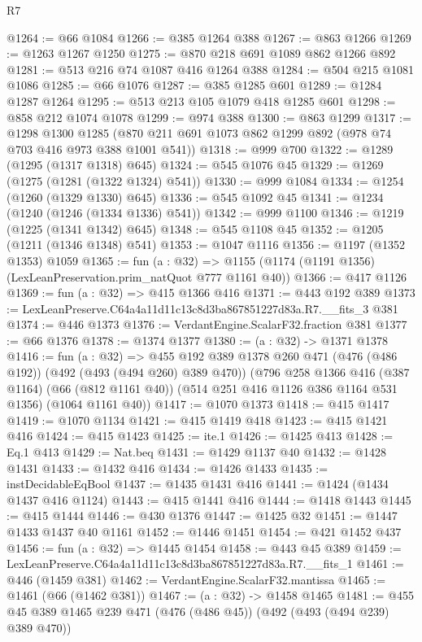 \begin{lexlean}{R7}
\begin{coremodule}
@1264 := @66 @1084
@1266 := @385 @1264 @388
@1267 := @863 @1266
@1269 := @1263 @1267 @1250
@1275 := @870 @218 @691 @1089 @862 @1266 @892
@1281 := @513 @216 @74 @1087 @416 @1264 @388
@1284 := @504 @215 @1081 @1086
@1285 := @66 @1076
@1287 := @385 @1285 @601
@1289 := @1284 @1287 @1264
@1295 := @513 @213 @105 @1079 @418 @1285 @601
@1298 := @858 @212 @1074 @1078
@1299 := @974 @388
@1300 := @863 @1299
@1317 := @1298
    @1300
    @1285
    (@870 @211 @691 @1073 @862 @1299 @892 (@978 @74 @703 @416 @973 @388 @1001 @541))
@1318 := @999 @700
@1322 := @1289 (@1295 (@1317 @1318) @645)
@1324 := @545 @1076 @45
@1329 := @1269 (@1275 (@1281 (@1322 @1324) @541))
@1330 := @999 @1084
@1334 := @1254 (@1260 (@1329 @1330) @645)
@1336 := @545 @1092 @45
@1341 := @1234 (@1240 (@1246 (@1334 @1336) @541))
@1342 := @999 @1100
@1346 := @1219 (@1225 (@1341 @1342) @645)
@1348 := @545 @1108 @45
@1352 := @1205 (@1211 (@1346 @1348) @541)
@1353 := @1047 @1116
@1356 := @1197 (@1352 @1353) @1059
@1365 := fun (a : @32) =>
  @1155 (@1174 (@1191 @1356) (LexLeanPreservation.prim_natQuot @777 @1161 @40))
@1366 := @417 @1126
@1369 := fun (a : @32) => @415 @1366 @416
@1371 := @443 @192 @389
@1373 := LexLeanPreserve.C64a4a11d11c13c8d3ba867851227d83a.R7.__fits_3 @381
@1374 := @446 @1373
@1376 := VerdantEngine.ScalarF32.fraction @381
@1377 := @66 @1376
@1378 := @1374 @1377
@1380 := (a : @32) -> @1371 @1378
@1416 := fun (a : @32) =>
  @455
    @192
    @389
    @1378
    @260
    @471
    (@476 (@486 @192))
    (@492 (@493 (@494 @260) @389 @470))
    (@796
      @258
      @1366
      @416
      (@387 @1164)
      (@66 (@812 @1161 @40))
      (@514 @251 @416 @1126 @386 @1164 @531 @1356)
      (@1064 @1161 @40))
@1417 := @1070 @1373
@1418 := @415 @1417
@1419 := @1070 @1134
@1421 := @415 @1419 @418
@1423 := @415 @1421 @416
@1424 := @415 @1423
@1425 := ite.{1}
@1426 := @1425 @413
@1428 := Eq.{1} @413
@1429 := Nat.beq
@1431 := @1429 @1137 @40
@1432 := @1428 @1431
@1433 := @1432 @416
@1434 := @1426 @1433
@1435 := instDecidableEqBool
@1437 := @1435 @1431 @416
@1441 := @1424 (@1434 @1437 @416 @1124)
@1443 := @415 @1441 @416
@1444 := @1418 @1443
@1445 := @415 @1444
@1446 := @430 @1376
@1447 := @1425 @32
@1451 := @1447 @1433 @1437 @40 @1161
@1452 := @1446 @1451
@1454 := @421 @1452 @437
@1456 := fun (a : @32) => @1445 @1454
@1458 := @443 @45 @389
@1459 := LexLeanPreserve.C64a4a11d11c13c8d3ba867851227d83a.R7.__fits_1
@1461 := @446 (@1459 @381)
@1462 := VerdantEngine.ScalarF32.mantissa
@1465 := @1461 (@66 (@1462 @381))
@1467 := (a : @32) -> @1458 @1465
@1481 := @455 @45 @389 @1465 @239 @471 (@476 (@486 @45)) (@492 (@493 (@494 @239) @389 @470))

\end{coremodule}
\end{lexlean}
